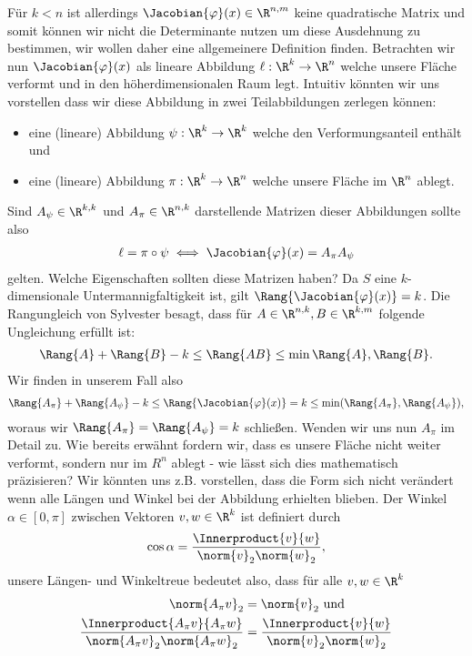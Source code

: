 \documentclass[a4paper,11pt]{article}
\begin{document}
Für $k < n$ ist allerdings $\Jacobian{\varphi}(x) \in \R^{n, m}$ keine quadratische Matrix und somit können wir nicht die Determinante nutzen um diese Ausdehnung zu bestimmen, wir wollen daher eine allgemeinere Definition finden. Betrachten wir nun $\Jacobian{\varphi}(x)$ als lineare Abbildung $\ell : \R^k \to \R^n$ welche unsere Fläche verformt und in den höherdimensionalen Raum legt. Intuitiv könnten wir uns vorstellen dass wir diese Abbildung in zwei Teilabbildungen zerlegen können:
\begin{itemize}
    \item eine (lineare) Abbildung $\psi : \R^k \to \R^k$ welche den Verformungsanteil enthält und
    \item eine (lineare) Abbildung $\pi : \R^k \to \R^n$ welche unsere Fläche im $\R^n$ ablegt.
\end{itemize}
Sind $A_\psi \in \R^{k, k}$ und $A_\pi \in \R^{n,k}$ darstellende Matrizen dieser Abbildungen sollte also
\begin{align*}
    \ell = \pi \circ \psi \iff \Jacobian{\varphi}(x) = A_\pi A_\psi
\end{align*}
gelten. Welche Eigenschaften sollten diese Matrizen haben? Da $S$ eine $k$-dimensionale Untermannigfaltigkeit ist, gilt $\Rang{\Jacobian{\varphi}(x)} = k$. Die Rangungleich von Sylvester besagt, dass für $A \in \R^{n,k}, B \in \R^{k, m}$ folgende Ungleichung erfüllt ist:
\begin{align*}
    \Rang{A} + \Rang{B} - k \leq \Rang{AB} \leq \min{\Rang{A}, \Rang{B}}.
\end{align*}
Wir finden in unserem Fall also
\begin{align*}
    \Rang{A_\pi} + \Rang{A_\psi} - k \leq \Rang{\Jacobian{\varphi}(x)} = k \leq \min (\Rang{A_\pi}, \Rang{A_\psi}),
\end{align*}
woraus wir $\Rang{A_\pi} = \Rang{A_\psi} = k$ schließen. Wenden wir uns nun $A_\pi$ im Detail zu. Wie bereits erwähnt fordern wir, dass es unsere Fläche nicht weiter verformt, sondern nur im $R^n$ ablegt - wie lässt sich dies mathematisch präzisieren? Wir könnten uns z.B. vorstellen, dass die Form sich nicht verändert wenn alle Längen und Winkel bei der Abbildung erhielten blieben.
Der Winkel $\alpha \in [0, \pi]$ zwischen Vektoren $v,w \in \R^k$ ist definiert durch
\begin{align*}
    \cos \alpha = \frac{\Innerproduct{v}{w}}{\norm{v}_2 \norm{w}_2},
\end{align*}
unsere Längen- und Winkeltreue bedeutet also, dass für alle $v, w \in \R^k$
\begin{align*}
    \norm{A_\pi v}_2                                                          & = \norm{v}_2 \text{ und}                            \\
    \frac{\Innerproduct{A_\pi v}{A_\pi w}}{\norm{A_\pi v}_2 \norm{A_\pi w}_2} & = \frac{\Innerproduct{v}{w}}{\norm{v}_2 \norm{w}_2}
\end{align*}
\end{document}
